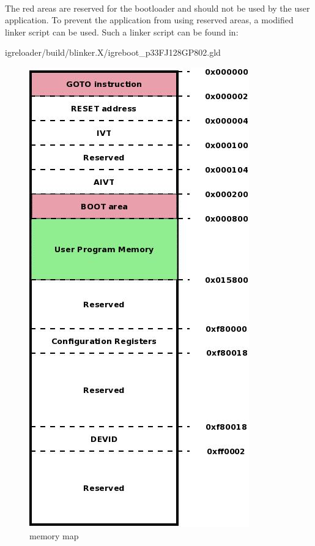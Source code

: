 \documentclass[a4paper, 11pt]{article}
\begin{document}
\paragraph{}
The red areas are reserved for the bootloader and should not be used by the user application. To prevent
the application from using reserved areas, a modified linker script can be used. Such a linker script can
be found in:
\begin{center}
igreloader/build/blinker.X/igreboot\_p33FJ128GP802.gld
\end{center}

\begin{figure}[]
\centering
\includegraphics[scale=0.4]{./dia/memory_map/main.jpeg}
\caption{memory map}
\label{memory_map}
\end{figure}
\end{document}
